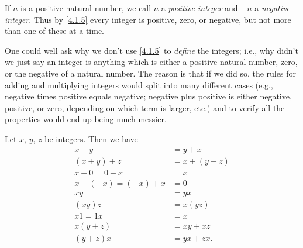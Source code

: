 \begin{note}
  If \(n\) is a positive natural number, we call \(n\) a \emph{positive integer} and \(-n\) a \emph{negative integer}.
  Thus by \cref{4.1.5} every integer is positive, zero, or negative, but not more than one of these at a time.
\end{note}

\begin{note}
  One could well ask why we don't use \cref{4.1.5} to \emph{define} the integers;
  i.e., why didn't we just say an integer is anything which is either a positive natural number, zero, or the negative of a natural number.
  The reason is that if we did so, the rules for adding and multiplying integers would split into many different cases (e.g., negative times positive equals negative; negative plus positive is either negative, positive, or zero, depending on which term is larger, etc.) and to verify all the properties would end up being much messier.
\end{note}

\begin{prop}\label{4.1.6}
  Let \(x\), \(y\), \(z\) be integers.
  Then we have
  \begin{align*}
    x + y               & = y + x       \\
    (x + y) + z         & = x + (y + z) \\
    x + 0 = 0 + x       & = x           \\
    x + (-x) = (-x) + x & = 0           \\
    xy                  & = yx          \\
    (xy)z               & = x(yz)       \\
    x1 = 1x             & = x           \\
    x(y + z)            & = xy + xz     \\
    (y + z)x            & = yx + zx.
  \end{align*}
\end{prop}

